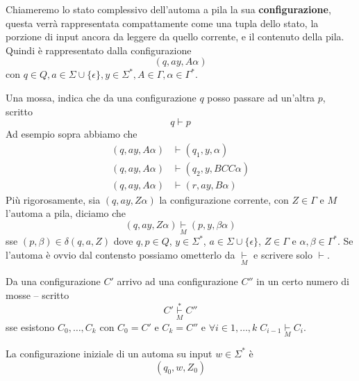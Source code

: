 \documentclass[12pt]{report}
\begin{document}
Chiameremo lo stato complessivo dell'automa a pila la sua \textbf{configurazione}, questa verrà rappresentata compattamente come una tupla dello stato, la porzione di input ancora da leggere da quello corrente, e il contenuto della pila.
Quindi 
è rappresentato dalla configurazione
$$ (q, ay, A\alpha) $$
con $q \in Q, a \in \Sigma \cup \{\epsilon\}, y \in \Sigma^*, A \in \Gamma, \alpha \in \Gamma^*$.

Una mossa, indica che da una configurazione $q$ posso passare ad un'altra $p$, scritto
$$ q \vdash p$$
Ad esempio sopra abbiamo che
\begin{align*}
	(q, ay, A\alpha) &\vdash (q_1, y, \alpha) \\
	(q, ay, A\alpha) &\vdash (q_2, y, BCC\alpha) \\
	(q, ay, A\alpha) &\vdash (r, ay, B\alpha)
\end{align*}
Più rigorosamente, sia $(q, ay, Z\alpha)$ la configurazione corrente, con $Z \in \Gamma$ e $M$ l'automa a pila, diciamo che
$$ (q, ay, Z\alpha) \underset{M}{\vdash} (p, y, \beta\alpha) $$
sse $(p, \beta) \in \delta(q, a, Z)$ dove $q, p \in Q$, $y \in \Sigma^*$, $a \in \Sigma \cup \{\epsilon\}$, $Z \in \Gamma$ e $\alpha, \beta \in \Gamma^*$.
Se l'automa è ovvio dal contensto possiamo ometterlo da $\underset{M}{\vdash}$ e scrivere solo $\vdash$.

Da una configurazione $C'$ arrivo ad una configurazione $C''$ in un certo numero di mosse -- scritto 
$$ C' \underset{M}{\overset{*}{\vdash}} C'' $$
sse esistono $C_0, \dots, C_k$ con $C_0 = C'$ e $C_k = C''$ e $\forall i \in 1, \dots, k \; C_{i - 1} \underset{M}{\vdash} C_i$.

La configurazione iniziale di un automa su input $w \in \Sigma^*$ è 
$$ (q_0, w, Z_0) $$
\end{document}
